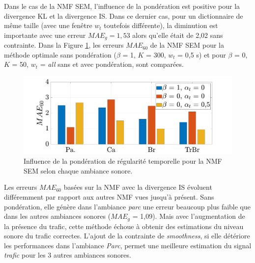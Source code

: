 Dans le cas de la NMF SEM, l'influence de la pondération est positive pour la divergence KL et la divergence IS. Dans ce dernier cas, pour un dictionnaire de même taille (avec une fenêtre $w_t$ toutefois différente), la diminution est importante avec une erreur $MAE_g = 1,53$ alors qu'elle était de 2,02 sans contrainte. 
Dans la Figure \ref{fig:smoothMAE60}, les erreurs $MAE_{60}$ de la NMF SEM pour la méthode optimale sans pondération ($\beta$ = 1, $K$ = 300, $w_t$ = 0,5 s) et pour $\beta$ = 0, $K$ = 50, $w_t$ = \textit{all} sans et avec pondération, sont comparées. 

\begin{figure}[h!]
\centering
\includegraphics[width=.9\linewidth]{./figures/resultats/grafic_smooth_bar.pdf}
\caption{Influence de la pondération de régularité temporelle pour la NMF SEM selon chaque ambiance sonore.}
\label{fig:smoothMAE60}
\end{figure}

Les erreurs $MAE_{60}$ basées sur la NMF avec la divergence IS évoluent différemment par rapport aux autres NMF vues jusqu'à présent. Sans pondération, elle génère dans l'ambiance \textit{parc} une erreur beaucoup plus faible que dans les autres ambiances sonores ($MAE_g$ = 1,09). Mais avec l'augmentation de la présence du trafic, cette méthode échoue à obtenir des estimations du niveau sonore du trafic correctes. L'ajout de la contrainte de \textit{smoothness}, si elle détériore les performances dans l'ambiance \textit{Parc}, permet une meilleure estimation du signal \textit{trafic} pour les 3 autres ambiances sonores.


